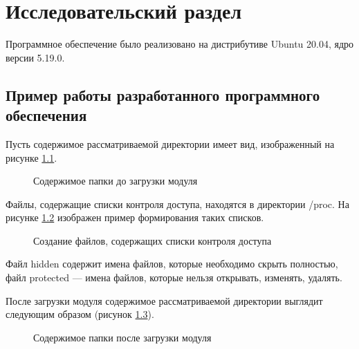 \chapter{Исследовательский раздел}
\label{cha:research}

Программное обеспечение было реализовано на дистрибутиве Ubuntu 20.04, ядро версии 5.19.0.

\section{Пример работы разработанного программного обеспечения}

Пусть содержимое рассматриваемой директории имеет вид, изображенный на рисунке \ref{fig:ls_before}.

\begin{figure}[ph!]
	\caption{Содержимое папки до загрузки модуля}
	\label{fig:ls_before}
\end{figure}

Файлы, содержащие списки контроля доступа, находятся в директории /proc.
На рисунке \ref{fig:proc} изображен пример формирования таких списков. 

\begin{figure}[ph!]
	\caption{Создание файлов, содержащих списки контроля доступа}
	\label{fig:proc}
\end{figure}

Файл hidden содержит имена файлов, которые необходимо скрыть полностью, файл protected ---  имена файлов, которые нельзя открывать, изменять, удалять.

После загрузки модуля содержимое рассматриваемой директории выглядит следующим образом (рисунок \ref{fig:ls_after}).

\begin{figure}[ph!]
	\caption{Содержимое папки после загрузки модуля}
	\label{fig:ls_after}
\end{figure}

